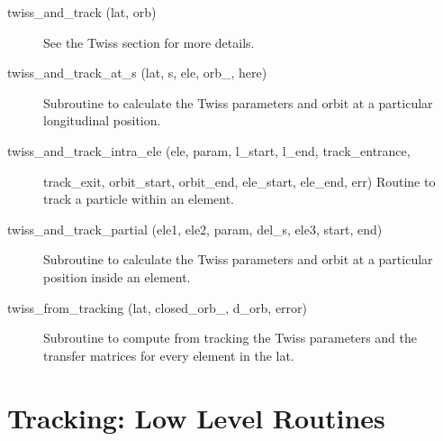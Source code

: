 \begin{description}
\label{r:twiss.and.track}
\item[twiss_and_track (lat, orb)] \Newline
See the Twiss section for more details. 

\label{r:twiss.and.track.at.s}
\item[twiss_and_track_at_s (lat, s, ele, orb_, here)] \Newline
Subroutine to calculate the Twiss parameters and orbit at a particular longitudinal position. 

\label{r:twiss.and.track.intra.ele}
\item[twiss_and_track_intra_ele (ele, param, l_start, l_end, track_entrance, ] \Newline 
                              track_exit, orbit_start, orbit_end, ele_start, ele_end, err)
Routine to track a particle within an element.

\label{r:twiss.and.track.partial}
\item[twiss_and_track_partial (ele1, ele2, param, del_s, ele3, start, end)] \Newline
Subroutine to calculate the Twiss parameters and orbit at a particular position inside an element. 

\item[twiss_from_tracking (lat, closed_orb_, d_orb, error)] \Newline
Subroutine to compute from tracking the Twiss parameters and the transfer matrices 
for every element in the lat. 

\end{description}

\section{Tracking: Low Level Routines}
\label{r:low.track}

